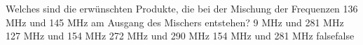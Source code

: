     {Welches sind die erwünschten Produkte, die bei der Mischung der Frequenzen 136 MHz und 145 MHz am Ausgang des Mischers entstehen?}
    {9 MHz und 281 MHz}
    {127 MHz und 154 MHz}
    {272 MHz und 290 MHz}
    {154 MHz und 281 MHz}
    {false}{false}